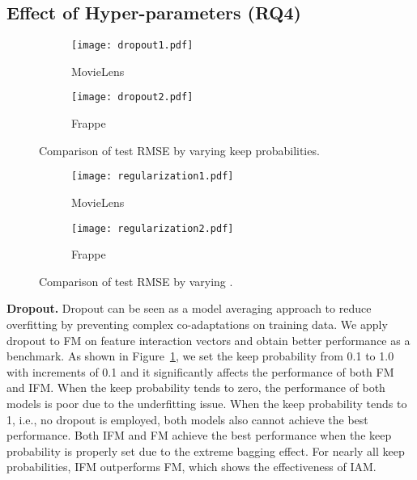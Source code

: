 \documentclass[letterpaper]{article} \usepackage{aaai19}  \usepackage{times}  \usepackage{helvet}  \usepackage{courier}  \usepackage{url}  \usepackage{graphicx}  \frenchspacing  \setlength{\pdfpagewidth}{8.5in}  \setlength{\pdfpageheight}{11in}  \usepackage{mathtools}
\begin{document}
\subsection{Effect of Hyper-parameters (\textbf{RQ4})}

\begin{figure}[t!]
\begin{center} 
\begin{subfigure}[MovieLens]{0.47\columnwidth}
{
\texttt{[image: dropout1.pdf]}
\caption{MovieLens}
} 
\end{subfigure}
\begin{subfigure}[Frappe]{0.47\columnwidth}
{
\texttt{[image: dropout2.pdf]}
\caption{Frappe}
} 
\end{subfigure}
\caption{ Comparison of test RMSE by varying keep probabilities.} 
\label{fig:dropout}  
\end{center}
\end{figure} 


\begin{figure}[t!]
\begin{center} 
\begin{subfigure}[MovieLens]{0.47\columnwidth}
{
\texttt{[image: regularization1.pdf]}
\caption{MovieLens}
} 
\end{subfigure} 
\begin{subfigure}[Frappe]{0.47\columnwidth}
{
\texttt{[image: regularization2.pdf]}
\caption{Frappe}
}
\end{subfigure} 
\caption{ Comparison of test RMSE by varying .}
\label{fig:regularization} 
\end{center}
\end{figure} 

\textbf{Dropout.} Dropout can be seen as a model averaging approach to reduce overfitting by preventing complex co-adaptations on training data. We apply dropout to FM on feature interaction vectors and obtain better performance as a benchmark. As shown in Figure~\ref{fig:dropout}, we set the keep probability from 0.1 to 1.0 with increments of 0.1 and it significantly affects the performance of both FM and IFM. When the keep probability tends to zero, the performance of both models is poor due to the underfitting issue. When the keep probability tends to 1, i.e., no dropout is employed, both models also cannot achieve the best performance. Both IFM and FM achieve the best performance when the keep probability is properly set due to the extreme bagging effect. For nearly all keep probabilities, IFM outperforms FM, which shows the effectiveness of IAM.
\end{document}
